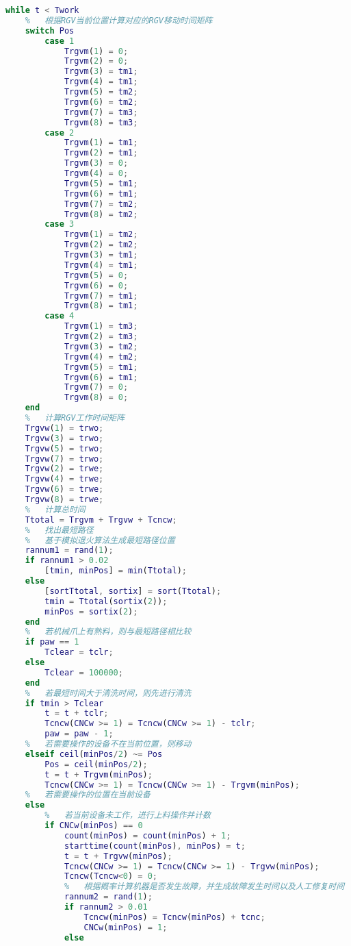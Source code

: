 \documentclass[no-math,withoutpreface,bwprint]{cumcmthesis} %
\numberwithin{equation}{section}
\numberwithin{figure}{section}
\numberwithin{table}{section}
\begin{document}
\begin{lstlisting}[language=matlab]
while t < Twork
    %   根据RGV当前位置计算对应的RGV移动时间矩阵
    switch Pos
        case 1
            Trgvm(1) = 0;
          	Trgvm(2) = 0;
            Trgvm(3) = tm1;
           	Trgvm(4) = tm1;
         	Trgvm(5) = tm2;
           	Trgvm(6) = tm2;
          	Trgvm(7) = tm3;
           	Trgvm(8) = tm3;
       	case 2
           	Trgvm(1) = tm1;
           	Trgvm(2) = tm1;
         	Trgvm(3) = 0;
          	Trgvm(4) = 0;
           	Trgvm(5) = tm1;
          	Trgvm(6) = tm1;
           	Trgvm(7) = tm2;
           	Trgvm(8) = tm2;               
        case 3
           	Trgvm(1) = tm2;
          	Trgvm(2) = tm2;
          	Trgvm(3) = tm1;
         	Trgvm(4) = tm1;
          	Trgvm(5) = 0;
           	Trgvm(6) = 0;
          	Trgvm(7) = tm1;
           	Trgvm(8) = tm1;
     	case 4
         	Trgvm(1) = tm3;
          	Trgvm(2) = tm3;
           	Trgvm(3) = tm2;
          	Trgvm(4) = tm2;
           	Trgvm(5) = tm1;
          	Trgvm(6) = tm1;
        	Trgvm(7) = 0;
           	Trgvm(8) = 0;        
    end
    %   计算RGV工作时间矩阵
	Trgvw(1) = trwo;
	Trgvw(3) = trwo;
    Trgvw(5) = trwo;
	Trgvw(7) = trwo;
	Trgvw(2) = trwe;
	Trgvw(4) = trwe;
	Trgvw(6) = trwe;
	Trgvw(8) = trwe;
    %   计算总时间
    Ttotal = Trgvm + Trgvw + Tcncw;
    %   找出最短路径
    %   基于模拟退火算法生成最短路径位置
    rannum1 = rand(1);
    if rannum1 > 0.02
        [tmin, minPos] = min(Ttotal);
    else
        [sortTtotal, sortix] = sort(Ttotal);
        tmin = Ttotal(sortix(2));
        minPos = sortix(2);
    end
    %   若机械爪上有熟料，则与最短路径相比较
    if paw == 1
        Tclear = tclr;
    else
        Tclear = 100000;
    end
    %   若最短时间大于清洗时间，则先进行清洗
    if tmin > Tclear
        t = t + tclr;
        Tcncw(CNCw >= 1) = Tcncw(CNCw >= 1) - tclr;
        paw = paw - 1;
    %   若需要操作的设备不在当前位置，则移动
    elseif ceil(minPos/2) ~= Pos
        Pos = ceil(minPos/2);
        t = t + Trgvm(minPos);
        Tcncw(CNCw >= 1) = Tcncw(CNCw >= 1) - Trgvm(minPos);
    %   若需要操作的位置在当前设备
    else
        %   若当前设备未工作，进行上料操作并计数
        if CNCw(minPos) == 0
            count(minPos) = count(minPos) + 1;
            starttime(count(minPos), minPos) = t;
            t = t + Trgvw(minPos);
            Tcncw(CNCw >= 1) = Tcncw(CNCw >= 1) - Trgvw(minPos);
            Tcncw(Tcncw<0) = 0;
            %   根据概率计算机器是否发生故障，并生成故障发生时间以及人工修复时间
            rannum2 = rand(1);
            if rannum2 > 0.01
                Tcncw(minPos) = Tcncw(minPos) + tcnc;
                CNCw(minPos) = 1;
            else

\end{lstlisting}
\end{document}
